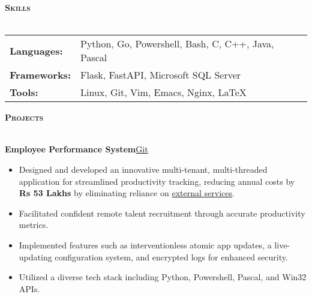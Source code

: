 \documentclass[a4paper]{article}
\newcommand{\lineunder} {
\vspace*{-8pt} \\
\hspace*{-18pt} \hrulefill \\
}
\newcommand{\header}[1]{%
{\hspace*{-18pt}\vspace*{6pt} \textsc{\textbf{\Large{#1}}}}%
\vspace*{-6pt} \lineunder
}
\begin{document}

\header{Skills}
\vspace{1mm}

\begin{tabular}{V{5cm} @{\hskip 0.6cm} V{12cm}}
\textbf{Languages:} & Python, Go, Powershell, Bash, C, C++, Java, Pascal \\
\textbf{Frameworks:} & Flask, FastAPI, Microsoft SQL Server \\
\textbf{Tools:} & Linux, Git, Vim, Emacs, Nginx, \LaTeX{} \\
\end{tabular}

\vspace{4mm}


\header{Projects}
\vspace{1mm}

{\textbf{Employee Performance System}}\hfill \href{https://github.com/swarnimcodes/employee-performance}{Git}\\
\begin{itemize} 
    \item Designed and developed an innovative multi-tenant, multi-threaded
    application for streamlined productivity
    tracking, reducing annual costs by \textbf{Rs 53 Lakhs} by eliminating 
    reliance on \href{https://desktime.com/}{external services}. \\
    \item Facilitated confident remote talent recruitment through accurate productivity metrics.\\ 
    \item Implemented features such as interventionless atomic app updates,
    a live-updating configuration system, and encrypted logs for enhanced security. \\
    \item Utilized a diverse tech stack including Python, Powershell, Pascal, and Win32 APIs. \\
\end{itemize}
\vspace*{2mm}
\end{document}
